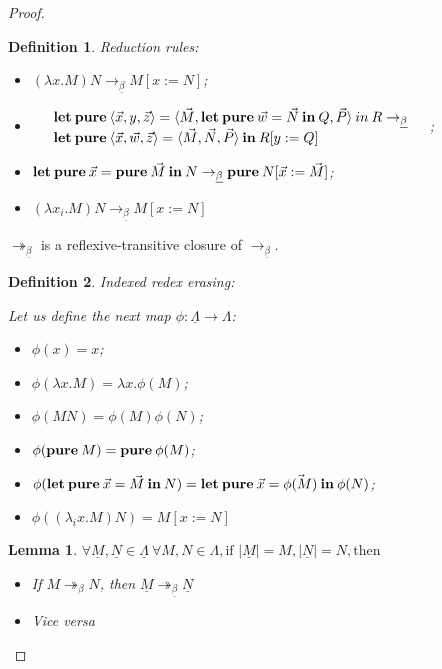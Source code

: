 \documentclass[a4paper]{article}
\newtheorem{lemma}{Lemma}
\newtheorem{defin}{Definition}
\begin{document}
\begin{proof}
\begin{defin} Reduction rules:

\begin{itemize}
  \item $(\lambda x. M) N \rightarrow_{\underline{\beta}} M [x := N]$;
  \item $\begin{array}{llll}
  & {\bf let \: pure \:} \langle \vec{x}, y, \vec{z} \rangle = \langle \vec{M}, {\bf let \: pure \: } \vec{w} = \vec{N} {\bf \: in \: } Q, \vec{P} \rangle {\: in \:} R \rightarrow_{\underline{\beta}} & \\
  & {\bf let \: pure \:} \langle \vec{x}, \vec{w}, \vec{z} \rangle = \langle \vec{M}, \vec{N}, \vec{P} \rangle \: { \bf in } \: R [y := Q]
  \end{array}$;
  \item ${\bf let \: pure \:} \vec{x} = {\bf pure \:} \vec{M} {\: \bf in \:} N \rightarrow_{\underline{\beta}} {\bf pure \:} N [\vec{x} := \vec{M}]$;
  \item $(\lambda x_i. M) N \rightarrow_{\underline{\beta}} M [x := N]$
\end{itemize}
\end{defin}

$\twoheadrightarrow_{\underline{\beta}}$ is a reflexive-transitive closure of $\rightarrow_{\underline{\beta}}$.

\begin{defin} Indexed redex erasing:

  Let us define the next map $\phi : \underline{\Lambda} \to \Lambda$:

  \begin{itemize}
    \item $\phi(x) = x$;
    \item $\phi(\lambda x. M) = \lambda x. \phi(M)$;
    \item $\phi(M N) = \phi(M) \phi(N)$;
    \item $\phi({\bf pure \:} M) = {\bf pure \:} \phi(M)$;
    \item $\phi({\bf let \: pure \:} \vec{x} = \vec{M} {\: \bf in \:} N) = {\bf let \: pure \:} \vec{x} = \vec{\phi(M)} {\: \bf in \:} \phi(N)$;
    \item $\phi((\lambda_i x. M) N) = M [x := N]$
  \end{itemize}
\end{defin}

\begin{lemma}

  $\forall \underline{M}, \underline{N} \in \underline{\Lambda} \: \forall M, N \in \Lambda, \text{if } |\underline{M}| = M, |\underline{N}| = N, \text{then}$
  \begin{itemize}
    \item If $M \twoheadrightarrow_{\beta} N$, then $\underline{M} \twoheadrightarrow_{\underline{\beta}} \underline{N}$
    \item Vice versa
  \end{itemize}
\end{lemma}


\end{proof}
\end{document}
